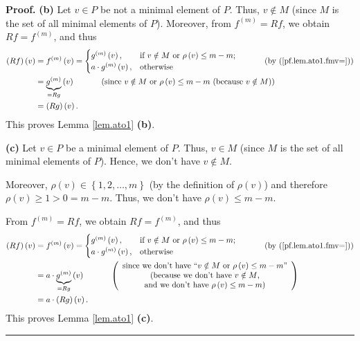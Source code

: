 \documentclass[numbers=enddot,12pt,final,onecolumn,notitlepage]{scrartcl}%
\theoremstyle{definition}
\newenvironment{verlong}{}{}
\newenvironment{proof}[1][Proof]{\noindent\textbf{#1.} }{\ \rule{0.5em}{0.5em}}
\begin{document}
\begin{verlong}
\begin{proof}
\textbf{(b)} Let $v\in P$ be not a minimal element of $P$. Thus, $v\notin M$
(since $M$ is the set of all minimal elements of $P$). Moreover, from
$f^{\left(  m\right)  }=Rf$, we obtain $Rf=f^{\left(  m\right)  }$, and thus%
\begin{align*}
\left(  Rf\right)  \left(  v\right)   &  =f^{\left(  m\right)  }\left(
v\right)  =%
\begin{cases}
g^{\left(  m\right)  }\left(  v\right)  , & \text{if }v\notin M\text{ or }%
\rho\left(  v\right)  \leq m-m;\\
a\cdot g^{\left(  m\right)  }\left(  v\right)  , & \text{otherwise}%
\end{cases}
\ \ \ \ \ \ \ \ \ \ \left(  \text{by (\ref{pf.lem.ato1.fmv=})}\right) \\
&  =\underbrace{g^{\left(  m\right)  }}_{=Rg}\left(  v\right)
\ \ \ \ \ \ \ \ \ \ \left(  \text{since }v\notin M\text{ or }\rho\left(
v\right)  \leq m-m\text{ (because }v\notin M\text{)}\right) \\
&  =\left(  Rg\right)  \left(  v\right)  .
\end{align*}
This proves Lemma \ref{lem.ato1} \textbf{(b)}. \medskip

\textbf{(c)} Let $v\in P$ be a minimal element of $P$. Thus, $v\in M$ (since
$M$ is the set of all minimal elements of $P$). Hence, we don't have $v\notin
M$.

Moreover, $\rho\left(  v\right)  \in\left\{  1,2,\ldots,m\right\}  $ (by the
definition of $\rho\left(  v\right)  $) and therefore $\rho\left(  v\right)
\geq1>0=m-m$. Thus, we don't have $\rho\left(  v\right)  \leq m-m$.

From $f^{\left(  m\right)  }=Rf$, we obtain $Rf=f^{\left(  m\right)  }$, and
thus%
\begin{align*}
\left(  Rf\right)  \left(  v\right)   &  =f^{\left(  m\right)  }\left(
v\right)  =%
\begin{cases}
g^{\left(  m\right)  }\left(  v\right)  , & \text{if }v\notin M\text{ or }%
\rho\left(  v\right)  \leq m-m;\\
a\cdot g^{\left(  m\right)  }\left(  v\right)  , & \text{otherwise}%
\end{cases}
\ \ \ \ \ \ \ \ \ \ \left(  \text{by (\ref{pf.lem.ato1.fmv=})}\right) \\
&  =a\cdot\underbrace{g^{\left(  m\right)  }}_{=Rg}\left(  v\right)
\ \ \ \ \ \ \ \ \ \ \left(
\begin{array}
[c]{c}%
\text{since we don't have \textquotedblleft}v\notin M\text{ or }\rho\left(
v\right)  \leq m-m\text{\textquotedblright}\\
\text{(because we don't have }v\notin M\text{,}\\
\text{and we don't have }\rho\left(  v\right)  \leq m-m\text{)}%
\end{array}
\right) \\
&  =a\cdot\left(  Rg\right)  \left(  v\right)  .
\end{align*}
This proves Lemma \ref{lem.ato1} \textbf{(c)}.
\end{proof}
\end{verlong}
\end{document}
